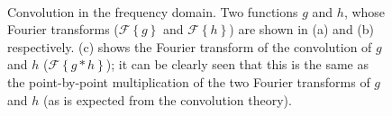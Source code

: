 \begin{figure}[t]
\begin{center}
\\
\caption[Convolution in the frequency domain.]{Convolution in the frequency domain. Two functions $g$ and $h$, whose Fourier transforms ($\mathcal{F}\left\{g\right\}$ and $\mathcal{F}\left\{h\right\}$) are shown in (a) and (b) respectively. (c) shows the Fourier transform of the convolution of $g$ and $h$ ($\mathcal{F}\left\{g \ast h\right\}$); it can be clearly seen that this is the same as the point-by-point multiplication of the two Fourier transforms of $g$ and $h$ (as is expected from the convolution theory).}
\label{fig:convolution_freq}
\end{center}
\end{figure}
%
